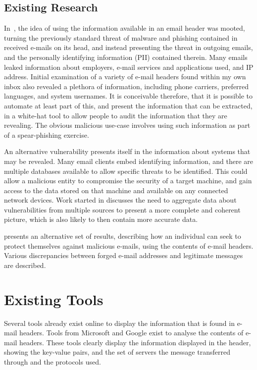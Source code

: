 \subsection{Existing Research}

In~\cite{nurse2015investigating}, the idea of using the information available
in an email header was mooted, turning the previously standard threat of
malware and phishing contained in received e-mails on its head, and instead
presenting the threat in outgoing emails, and the personally identifying
information (PII) contained therein.  Many emails leaked information about
employers, e-mail services and applications used, and IP address.  Initial
examination of a variety of e-mail headers found within my own inbox also
revealed a plethora of information, including phone carriers, preferred
languages, and system usernames.  It is conceivable therefore, that it is
possible to automate at least part of this, and present the information that
can be extracted, in a white-hat tool to allow people to audit the information
that they are revealing.  The obvious malicious use-case involves using such
information as part of a spear-phishing exercise.

An alternative vulnerability presents itself in the information about systems
that may be revealed.  Many email clients embed identifying information, and
there are multiple databases available to allow specific threats to be
identified.  This could allow a malicious entity to compromise the security of
a target machine, and gain access to the data stored on that machine and
available on any connected network devices.  Work started in
\cite{joshi2013extracting} discusses the need to aggregate data about
vulnerabilities from multiple sources to present a more complete and coherent
picture, which is also likely to then contain more accurate data.

\cite{Al-zarouni_tracinge-mail} presents an alternative set of results,
describing how an individual can seek to protect themselves against malicious
e-mails, using the contents of e-mail headers.  Various discrepancies between
forged e-mail addresses and legitimate messages are described.

\section{Existing Tools}

Several tools already exist online to display the information that is found in
e-mail headers.  Tools from Microsoft and Google exist to analyse the contents
of e-mail headers.  These tools clearly display the information displayed in
the header, showing the key-value pairs, and the set of servers the message
transferred through and the protocols used.

